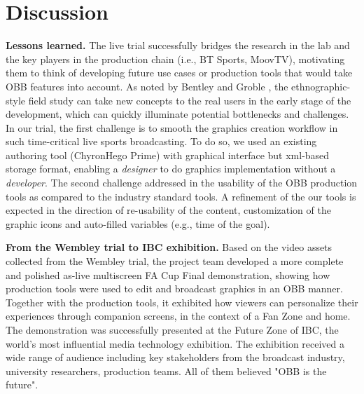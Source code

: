 \documentclass[sigchi-a, authorversion]{acmart}
\begin{document}
\section{Discussion}

\textbf{Lessons learned.} The live trial successfully bridges the research in the lab and the key players in the production chain (i.e., BT Sports, MoovTV), motivating them to think of developing future use cases or production tools that would take OBB features into account. As noted by Bentley and Groble \cite{bentley2009}, the ethnographic-style field study can take new concepts to the real users in the early stage of the development, which can quickly illuminate potential bottlenecks and challenges. In our trial, the first challenge is to smooth the graphics creation workflow in such time-critical live sports broadcasting. To do so, we used an existing authoring tool (ChyronHego Prime) with graphical interface but xml-based storage format, enabling a \textit{designer} to do graphics implementation without a \textit{developer}. The second challenge addressed in the usability of the OBB production tools as compared to the industry standard tools. A refinement of the our tools is expected in the direction of re-usability of the content, customization of the graphic icons and auto-filled variables (e.g., time of the goal).


\textbf{From the Wembley trial to IBC exhibition.} Based on the video assets collected from the Wembley trial, the project team developed a more complete and polished as-live multiscreen FA Cup Final demonstration, showing how production tools were used to edit and broadcast graphics in an OBB manner. Together with the production tools, it exhibited how viewers can personalize their experiences through companion screens, in the context of a Fan Zone and home. The demonstration was successfully presented at the Future Zone of IBC, the world's most influential media technology exhibition. The exhibition received a wide range of audience including key stakeholders from the broadcast industry, university researchers, production teams. All of them believed "OBB is the future".
\end{document}
